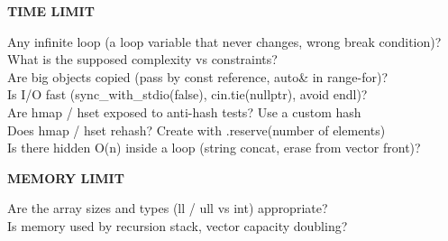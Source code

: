 \vspace{-1em}
\textbf{TIME LIMIT}

{\normalsize
Any infinite loop (a loop variable that never changes, wrong break condition)? \\
What is the supposed complexity vs constraints? \\
Are big objects copied (pass by const reference, auto\& in range-for)? \\
Is I/O fast (sync\_with\_stdio(false), cin.tie(nullptr), avoid endl)? \\
Are hmap / hset exposed to anti-hash tests? Use a custom hash \\
Does hmap / hset rehash? Create with .reserve(number of elements) \\
Is there hidden O(n) inside a loop (string concat, erase from vector front)? \\
\par}

\vspace{-1em}
\textbf{MEMORY LIMIT}

{\normalsize
Are the array sizes and types (ll / ull vs int) appropriate? \\
Is memory used by recursion stack, vector capacity doubling? \\
\par}